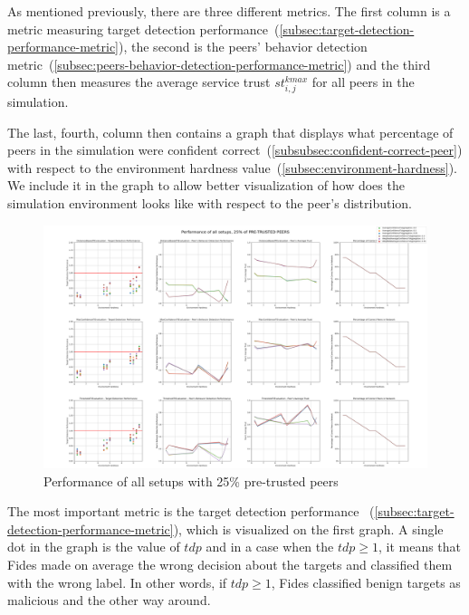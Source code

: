 As mentioned previously, there are three different metrics.
The first column is a metric measuring target detection performance~(\ref{subsec:target-detection-performance-metric}), the second is the peers' behavior detection metric~(\ref{subsec:peers-behavior-detection-performance-metric}) and the third column then measures the average service trust $st^{kmax}_{i, j}$ for all peers in the simulation.

The last, fourth, column then contains a graph that displays what percentage of peers in the simulation were confident correct~(\ref{subsubsec:confident-correct-peer}) with respect to the environment hardness value~(\ref{subsec:environment-hardness}).
We include it in the graph to allow better visualization of how does the simulation environment looks like with respect to the peer's distribution.

\begin{figure}[hp!]
    \centering
    \includegraphics[width=0.94\paperwidth, angle=90]{assets/25_all_metrics.png}
    \caption{Performance of all setups with 25\% pre-trusted peers}
    \label{fig:performance-all-setups-25-pretrusted}
\end{figure}

The most important metric is the target detection performance ~(\ref{subsec:target-detection-performance-metric}), which is visualized on the first graph.
A single dot in the graph is the value of $tdp$ and in a case when the $tdp \geq 1$, it means that Fides made on average the wrong decision about the targets and classified them with the wrong label.
In other words, if $tdp \geq 1$, Fides classified benign targets as malicious and the other way around.

